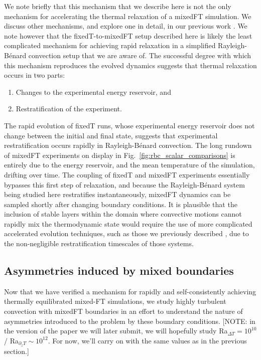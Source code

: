 \documentclass[aps, pre, onecolumn, nofootinbib, notitlepage, groupedaddress, amsfonts, amssymb, amsmath, longbibliography]{revtex4-1}
\newcommand{\RB}{Rayleigh-B\'{e}nard }
\begin{document}
We note briefly that this mechanism that we describe here is not the only mechanism for accelerating the thermal relaxation of a mixedFT simulation.
We discuss other mechanisms, and explore one in detail, in our previous work \cite{anders&all2018}.
We note however that the fixedT-to-mixedFT setup described here is likely the least complicated mechanism for achieving rapid relaxation in a simplified \RB convection setup that we are aware of.
The successful degree with which this mechanism reproduces the evolved dynamics suggests that thermal relaxation occurs in two parts:
\begin{enumerate}
\item Changes to the experimental energy reservoir, and
\item Restratification of the experiment.
\end{enumerate}
The rapid evolution of fixedT runs, whose experimental energy reservoir does not change between the initial and final state, suggests that experimental restratification occurs rapidly in \RB convection.
The long rundown of mixedFT experiments on display in Fig.~\ref{fig:rbc_scalar_comparisons} is entirely due to the energy reservoir, and the mean temperature of the simulation, drifting over time.
The coupling of fixedT and mixedFT experiments essentially bypasses this first step of relaxation, and because the \RB system being studied here restratifies instantaneously, mixedFT dynamics can be sampled shortly after changing boundary conditions.
It is plausible that the inclusion of stable layers within the domain where convective motions cannot rapidly mix the thermodynamic state would require the use of more complicated accelerated evolution techniques, such as those we previously described \cite{anders&all2018}, due to the non-negligible restratification timescales of those systems.

\subsection{Asymmetries induced by mixed boundaries}
\label{sec:asymmetries}
Now that we have verified a mechanism for rapidly and self-consistently achieving thermally equilibrated mixed-FT simulations, we study highly turbulent convection with mixedFT boundaries in an effort to understand the nature of asymmetries introduced to the problem by these boundary conditions.
[NOTE: in the version of the paper we will later submit, we will hopefully study Ra$_{\Delta T} = 10^{10}$ / Ra$_{\partial_z T} \sim 10^{12}$. For now, we'll carry on with the same values as in the previous section.]
\end{document}
